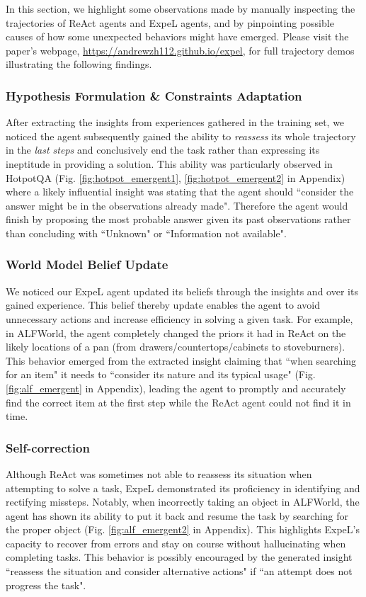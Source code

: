 \documentclass[letterpaper]{article} %
\begin{document}
In this section, we highlight some observations made by manually inspecting the trajectories of ReAct agents and ExpeL agents, and by pinpointing possible causes of how some unexpected behaviors might have emerged. Please visit the paper's webpage, \url{https://andrewzh112.github.io/expel}, for full trajectory demos illustrating the following findings.

\subsubsection{Hypothesis Formulation \& Constraints Adaptation}
After extracting the insights from experiences gathered in the training set, we noticed the agent subsequently gained the ability to \textit{reassess} its whole trajectory in the \textit{last steps} and conclusively end the task rather than expressing its ineptitude in providing a solution. This ability was particularly observed in HotpotQA (Fig. \ref{fig:hotpot_emergent1}, \ref{fig:hotpot_emergent2} in Appendix) where a likely influential insight was stating that the agent should ``consider the answer might be in the observations already made". Therefore the agent would finish by proposing the most probable answer given its past observations rather than concluding with ``Unknown" or ``Information not available".

\subsubsection{World Model Belief Update}
We noticed our ExpeL agent updated its beliefs through the insights and over its gained experience. This belief thereby update enables the agent to avoid unnecessary actions and increase efficiency in solving a given task. For example, in ALFWorld, the agent completely changed the priors it had in ReAct on the likely locations of a pan (from drawers/countertops/cabinets to stoveburners). This behavior emerged from the extracted insight claiming that ``when searching for an item" it needs to ``consider its nature and its typical usage" (Fig. \ref{fig:alf_emergent} in Appendix), leading the agent to promptly and accurately find the correct item at the first step while the ReAct agent could not find it in time.

\subsubsection{Self-correction}
Although ReAct was sometimes not able to reassess its situation when attempting to solve a task, ExpeL demonstrated its proficiency in identifying and rectifying missteps. Notably, when incorrectly taking an object in ALFWorld, the agent has shown its ability to put it back and resume the task by searching for the proper object (Fig. \ref{fig:alf_emergent2} in Appendix). This highlights ExpeL's capacity to recover from errors and stay on course without hallucinating when completing tasks. This behavior is possibly encouraged by the generated insight ``reassess the situation and consider alternative actions" if ``an attempt does not progress the task".
\end{document}
